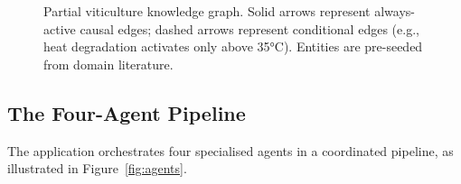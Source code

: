 \documentclass[12pt,a4paper]{article}
\begin{document}
\begin{figure}[htbp]
\caption{Partial viticulture knowledge graph. Solid arrows represent always-active
causal edges; dashed arrows represent conditional edges (e.g., heat degradation
activates only above 35°C). Entities are pre-seeded from domain literature.}
\label{fig:viticulture_kg}
\end{figure}

\subsection{The Four-Agent Pipeline}

The application orchestrates four specialised agents in a coordinated pipeline,
as illustrated in Figure~\ref{fig:agents}.
\end{document}
